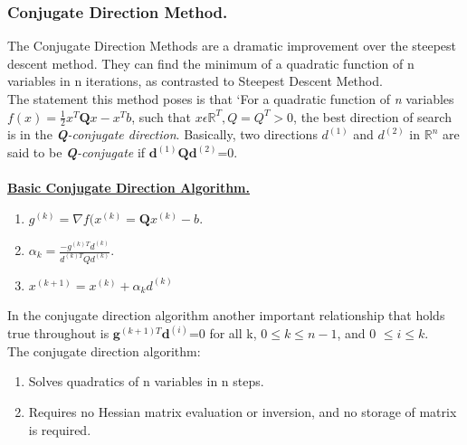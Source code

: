 \documentclass[12pt,a4paper,titlepage]{article}
\begin{document}
\subsubsection{Conjugate Direction Method.}
The Conjugate Direction Methods are a dramatic improvement over the steepest descent method. They can find the minimum of a quadratic function of n variables in n iterations, as contrasted to Steepest Descent Method. \\
The statement this method poses is that `For a quadratic function of \textit{n} variables $f(x)= \frac{1}{2}{x^T}\textbf{Q}x-{x^T}b$, such that $x  \epsilon  \mathbb{R}^T, Q= {Q^T} > 0$, the best direction of search is in the \textit{\textbf{Q}-conjugate direction}. Basically, two directions $d^{(1)}$ and $d^{(2)}$ in $\mathbb{R}^n$ are said to be \textit{\textbf{Q}-conjugate} if \textit{$\textbf{d}^{(1)}\textbf{Qd}^{(2)}$}=0. \\
\\\textbf{\underline{Basic Conjugate Direction Algorithm.}}
\begin{enumerate}
    \item $g^{(k)}= \nabla f(x^{(k)}= \textbf{Q}x^{(k)}-b.$
    \item $\alpha_{k}= \frac{-g^{(k)T}d^{(k)}}{d^{(k)T}Qd^{(k)}}.$
    \item $x^{(k+1)}  = x^{(k)}+ \alpha_{k}d^{(k)}$
\end{enumerate}
In the conjugate direction algorithm another important relationship that holds true throughout is $ \textbf{g}^{(k+1)T}\textbf{d}^{(i)}$=0 for all k, $0 \leq k \leq n-1$, and 0 $\leq i \leq k $.\\
The conjugate direction algorithm:
\begin{enumerate}
    \item Solves quadratics of n variables in n steps.
    \item Requires no Hessian matrix evaluation or inversion, and no storage of matrix is required.
\end{enumerate}
\end{document}
